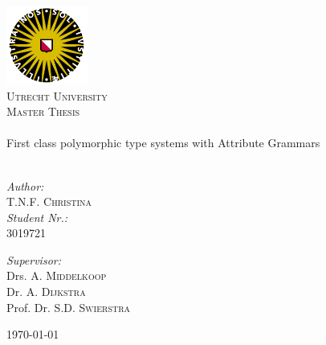 \begin{titlepage}
 
\begin{center}
 

 \includegraphics[width=0.20\textwidth]{./uu_logo}\\[1cm] 

\textsc{\LARGE Utrecht University}\\[1.5cm]
 
\textsc{\Large Master Thesis}\\[0.5cm]
 

 \HRule \\[0.4cm]
 { \huge  First class polymorphic type systems with Attribute Grammars}\\[0.4cm]
 
\HRule \\[1.5cm]
 
 \begin{minipage}{0.4\textwidth}
 \begin{flushleft} \large
 \emph{Author:}\\
 T.N.F. \textsc{Christina} \\
 \emph{Student Nr.:} \\
 3019721
 \end{flushleft}
 \end{minipage}
 \begin{minipage}{0.5\textwidth}
 \begin{flushright} \large
 \emph{Supervisor:} \\
 Drs. A. \textsc{Middelkoop} \\
 Dr. A. \textsc{Dijkstra} \\
 Prof. Dr. S.D. \textsc{Swierstra}
 \end{flushright}
 \end{minipage}
 
\vfill
\vfill
 
 {\large \today}
 
\end{center}
 
\end{titlepage}
